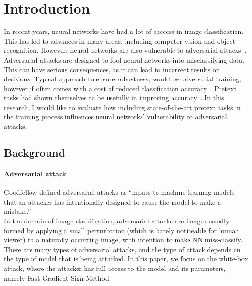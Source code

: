 \section{Introduction}

In recent years, neural networks have had a lot of success in image classification.
This has led to advances in many areas, including computer vision and object recognition.
However, neural networks are also vulnerable to adversarial attacks~\cite{ilyas2019adversarial}.
Adversarial attacks are designed to fool neural networks into misclassifying data.
This can have serious consequences, as it can lead to incorrect results or decisions.
Typical approach to ensure robustness, would be adversarial training, however if often comes with a cost of
reduced classification accuracy~\cite{https://doi.org/10.48550/arxiv.1805.12152}.
Pretext tasks had shown themselves to be usefully in improving accuracy~\cite{kolesnikov2019revisiting}.
In this research, I would like to evaluate how including state-of-the-art pretext tasks in the training process
influences neural networks' vulnerability to adversarial attacks.

\subsection{Background}

\paragraph{Adversarial attack}
Goodfellow defined adversarial attacks as “inputs to machine learning models that an
attacker has intentionally designed to cause the model to make a mistake.” ~\cite{DBLP:journals/corr/abs-1802-08195} \\
In the domain of image classification, adversarial attacks are images usually formed by applying a small perturbation
(which is barely noticeable for human viewer) to a naturally occurring image, with intention to make NN miss-classify.
There are many types of adversarial attacks, and the type of attack depends on the type of model that is being attacked.
In this paper, we focus on the white-box attack, where the attacker has full access to the model and its parameters,
namely Fast Gradient Sign Method.


